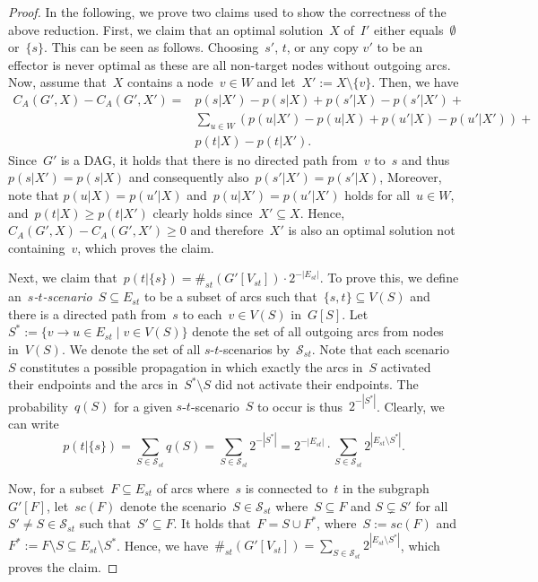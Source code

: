 \documentclass{article}
\begin{document}
\begin{proof}
  In the following, we prove two claims used to show the correctness
  of the above reduction.
  First, we claim that an optimal solution~$X$ of~$I'$ either
  equals~$\emptyset$ or~$\{s\}$.
  This can be seen as follows.
  Choosing~$s'$, $t$, or any copy $v'$ to be an effector is never optimal
  as these are all non-target nodes without outgoing arcs.
  Now, assume that~$X$ contains a node~$v\in W$ and let~$X':=X\setminus\{v\}$.
  Then, we have
  \begin{align*}
    C_A(G',X)-C_A(G',X') = &p(s|X')-p(s|X) + p(s'|X)-p(s'|X') +\\
    &\sum_{u\in W}(p(u|X') - p(u|X) + p(u'|X) - p(u'|X')) +\\
    &p(t|X)-p(t|X').
  \end{align*}
  Since~$G'$ is a DAG, it holds that there is no directed path from~$v$ to~$s$ and thus
  $p(s|X')=p(s|X)$ and consequently also~$p(s'|X')=p(s'|X)$,
  Moreover, note that $p(u|X)=p(u'|X)$ and~$p(u|X')=p(u'|X')$ holds for all~$u\in W$,
  and~$p(t|X) \ge p(t|X')$ clearly holds since~$X'\subseteq X$.
  Hence, $C_A(G',X)-C_A(G',X')\ge 0$ and
  therefore~$X'$ is also an optimal solution not containing~$v$,
  which proves the claim.

  Next, we claim that~$p(t|\{s\})=\#_{st}(G'[V_{st}])\cdot
  2^{-|E_{st}|}$.
  To prove this, we define an~\emph{$s$-$t$-scenario}~$S\subseteq
  E_{st}$ to be a subset of arcs such that~$\{s,t\}\subseteq V(S)$ and there
  is a directed path from~$s$ to each~$v\in V(S)$ in~$G[S]$.
  Let~$S^*:=\{v\to u\in E_{st}\mid v\in V(S)\}$
  denote the set of all outgoing arcs from nodes in~$V(S)$.
  We denote the set of all $s$-$t$-scenarios by~$\mathcal{S}_{st}$.
  Note that each scenario~$S$ constitutes a possible propagation
  in which exactly the arcs in~$S$ activated their endpoints and
  the arcs in~$S^*\setminus S$ did not activate their endpoints.
  The probability~$q(S)$ for a given $s$-$t$-scenario~$S$ to occur is
  thus~$2^{-|S^*|}$.
  Clearly, we can write
  \[p(t|\{s\})=\sum_{S\in\mathcal{S}_{st}}q(S)=\sum_{S\in\mathcal{S}_{st}}2^{-|S^*|}=
    2^{-|E_{st}|}\cdot\sum_{S\in\mathcal{S}_{st}}2^{|E_{st}\setminus S^*|}.\]

  Now, for a subset~$F\subseteq E_{st}$ of arcs where~$s$ is
  connected to~$t$ in the subgraph~$G'[F]$, let~$sc(F)$ denote
  the scenario~$S\in\mathcal{S}_{st}$ where~$S\subseteq F$ and
  $S\subsetneq S'$ for all~$S'\neq S\in \mathcal{S}_{st}$ such that~$S' \subseteq F$.
  It holds that~$F = S \cup F^*$, where~$S:=sc(F)$ and
  $F^*:=F\setminus S\subseteq E_{st}\setminus S^*$.
  Hence, we have~$\#_{st}(G'[V_{st}])=\sum_{S\in\mathcal{S}_{st}}2^{|E_{st}\setminus
    S^*|}$, which proves the claim.


\end{proof}
\end{document}
